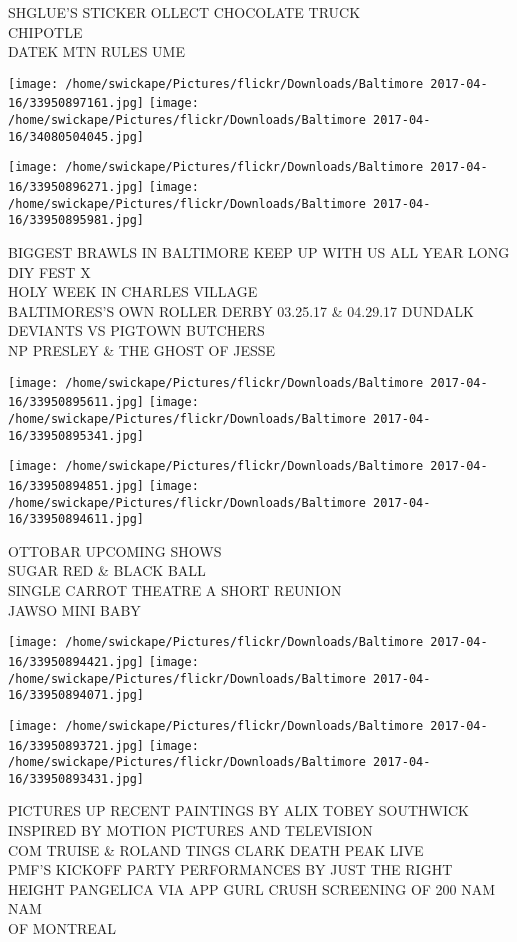 \documentclass[10pt,letterpaper]{article}
\begin{document}
SHGLUE'S STICKER OLLECT CHOCOLATE TRUCK\\
CHIPOTLE\\
DATEK MTN RULES UME
\pagebreak

\texttt{[image: /home/swickape/Pictures/flickr/Downloads/Baltimore 2017-04-16/33950897161.jpg]}
\texttt{[image: /home/swickape/Pictures/flickr/Downloads/Baltimore 2017-04-16/34080504045.jpg]}

\texttt{[image: /home/swickape/Pictures/flickr/Downloads/Baltimore 2017-04-16/33950896271.jpg]}
\texttt{[image: /home/swickape/Pictures/flickr/Downloads/Baltimore 2017-04-16/33950895981.jpg]}

BIGGEST BRAWLS IN BALTIMORE KEEP UP WITH US ALL YEAR LONG DIY FEST X\\
HOLY WEEK IN CHARLES VILLAGE\\
BALTIMORES'S OWN ROLLER DERBY 03.25.17 \& 04.29.17 DUNDALK DEVIANTS VS PIGTOWN BUTCHERS\\
NP PRESLEY \& THE GHOST OF JESSE
\pagebreak

\texttt{[image: /home/swickape/Pictures/flickr/Downloads/Baltimore 2017-04-16/33950895611.jpg]}
\texttt{[image: /home/swickape/Pictures/flickr/Downloads/Baltimore 2017-04-16/33950895341.jpg]}

\texttt{[image: /home/swickape/Pictures/flickr/Downloads/Baltimore 2017-04-16/33950894851.jpg]}
\texttt{[image: /home/swickape/Pictures/flickr/Downloads/Baltimore 2017-04-16/33950894611.jpg]}

OTTOBAR UPCOMING SHOWS\\
SUGAR RED \& BLACK BALL\\
SINGLE CARROT THEATRE A SHORT REUNION\\
JAWSO MINI BABY
\pagebreak

\texttt{[image: /home/swickape/Pictures/flickr/Downloads/Baltimore 2017-04-16/33950894421.jpg]}
\texttt{[image: /home/swickape/Pictures/flickr/Downloads/Baltimore 2017-04-16/33950894071.jpg]}

\texttt{[image: /home/swickape/Pictures/flickr/Downloads/Baltimore 2017-04-16/33950893721.jpg]}
\texttt{[image: /home/swickape/Pictures/flickr/Downloads/Baltimore 2017-04-16/33950893431.jpg]}

PICTURES UP RECENT PAINTINGS BY ALIX TOBEY SOUTHWICK INSPIRED BY MOTION PICTURES AND TELEVISION\\
COM TRUISE \& ROLAND TINGS CLARK DEATH PEAK LIVE\\
PMF'S KICKOFF PARTY PERFORMANCES BY JUST THE RIGHT HEIGHT PANGELICA VIA APP GURL CRUSH SCREENING OF 200 NAM NAM\\
OF MONTREAL
\pagebreak
\end{document}
